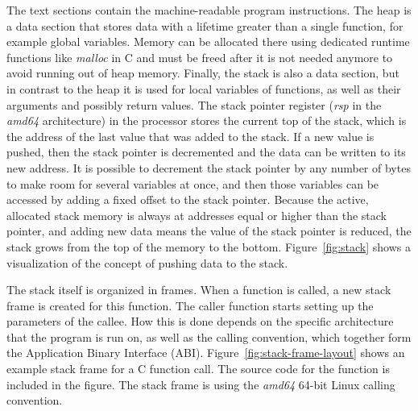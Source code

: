 The text sections contain the machine-readable program instructions.
The heap is a data section that stores data with a lifetime greater than a single function, for example global
variables.
Memory can be allocated there using dedicated runtime functions like \textit{malloc} in C and must be freed after it is
not needed anymore to avoid running out of heap memory.
Finally, the stack is also a data section, but in contrast to the heap it is used for local variables of functions, as
well as their arguments and possibly return values.
The stack pointer register (\textit{rsp} in the \textit{amd64} architecture) in the processor stores the current top
of the stack, which is the address of the last value that was added to the stack.
If a new value is pushed, then the stack pointer is decremented and the data can be written to its new address.
It is possible to decrement the stack pointer by any number of bytes to make room for several variables at once, and
then those variables can be accessed by adding a fixed offset to the stack pointer.
Because the active, allocated stack memory is always at addresses equal or higher than the stack pointer, and adding
new data means the value of the stack pointer is reduced, the stack grows from the top of the memory to the bottom.
Figure~\ref{fig:stack} shows a visualization of the concept of pushing data to the stack.



The stack itself is organized in frames.
When a function is called, a new stack frame is created for this function.
The caller function starts setting up the parameters of the callee.
How this is done depends on the specific architecture that the program is run on, as well as the calling convention,
which together form the Application Binary Interface (\acrshort{ABI}).
Figure~\ref{fig:stack-frame-layout} shows an example stack frame for a C function call.
The source code for the function is included in the figure.
The stack frame is using the \textit{amd64} 64-bit Linux calling convention.

